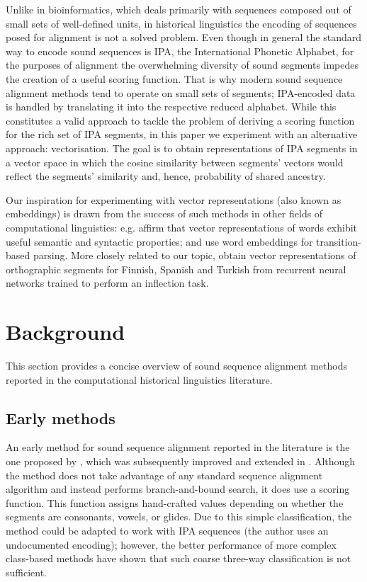 \documentclass[a4paper]{report}
\begin{document}
Unlike in bioinformatics, which deals primarily with sequences composed out of small sets of well-defined units,
in historical linguistics the encoding of sequences posed for alignment is not a solved problem.
Even though in general the standard way to encode sound sequences is IPA, the International Phonetic Alphabet,
for the purposes of alignment the overwhelming diversity of sound segments impedes the creation of a useful scoring function.
That is why modern sound sequence alignment methods tend to operate on small sets of segments;
IPA-encoded data is handled by translating it into the respective reduced alphabet.
While this constitutes a valid approach to tackle the problem of deriving a scoring function for the rich set of IPA segments,
in this paper we experiment with an alternative approach: vectorisation.
The goal is to obtain representations of IPA segments in a vector space
in which the cosine similarity between segments' vectors would reflect the segments' similarity and, hence, probability of shared ancestry.

Our inspiration for experimenting with vector representations (also known as embeddings)
is drawn from the success of such methods in other fields of computational linguistics:
e.g. \citet{2013_Mikolov_al} affirm that vector representations of words exhibit useful semantic and syntactic properties;
and \citet{2014_Chen_Manning} use word embeddings for transition-based parsing.
More closely related to our topic,
\citet{2018_Silfverberg_al} obtain vector representations of orthographic segments for Finnish, Spanish and Turkish
from recurrent neural networks trained to perform an inflection task.


\section{Background}

This section provides a concise overview of sound sequence alignment methods reported in the computational historical linguistics literature.


\subsection{Early methods}

An early method for sound sequence alignment reported in the literature is the one proposed by \citet{1996_Covington},
which was subsequently improved and extended in \citet{1998_Covington}.
Although the method does not take advantage of any standard sequence alignment algorithm and instead performs branch-and-bound search,
it does use a scoring function.
This function assigns hand-crafted values depending on whether the segments are consonants, vowels, or glides.
Due to this simple classification, the method could be adapted to work with IPA sequences (the author uses an undocumented encoding);
however, the better performance of more complex class-based methods have shown that such coarse three-way classification is not sufficient.
\end{document}
